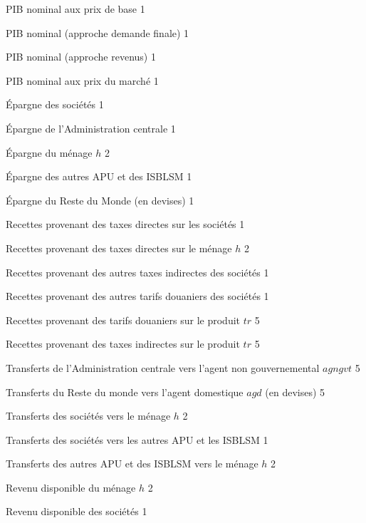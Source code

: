 \documentclass[11pt,a4paper]{article}
\newcommand{\agngvt}{\mathit{agngvt}}
\newcommand{\agd}{\mathit{agd}}
\newcommand{\gvt}{\mathsf{gvt}}
\newcommand{\firm}{\mathsf{firm}}
\newcommand{\ngo}{\mathsf{ngo}}
\newcommand{\row}{\mathsf{row}}
\newcommand{\YDF}{\mathit{YDF}}
\newcommand{\SNG}{\mathit{SNG}}
\newcommand{\SF}{\mathit{SF}}
\newcommand{\SG}{\mathit{SG}}
\newcommand{\SH}{\mathit{SH}}
\newcommand{\TI}{\mathit{TI}}
\newcommand{\TIF}{\mathit{TIF}}
\newcommand{\TIM}{\mathit{TIM}}
\newcommand{\TIMF}{\mathit{TIMF}}
\newcommand{\TRA}{\mathit{TRA}}
\newcommand{\tr}{\mathit{tr}}
\newcommand{\TDH}{\mathit{TDH}}
\newcommand{\TDF}{\mathit{TDF}}
\newcommand{\YDH}{\mathit{YDH}}
\newcommand{\SROW}{\mathit{SROW}}
\newcommand{\PIB}{\mathit{PIB}}
\begin{document}
\begin{description}[leftmargin=!,labelwidth=\widthof{\bfseries AAAAAAAA},parsep=10pt]
		\item[$\PIB^{\mathit{BP}}$]	PIB nominal aux prix de base			\hfill 1
		\item[$\PIB^{\mathit{FD}}$]	PIB nominal (approche demande finale)	\hfill 1
		\item[$\PIB^{\mathit{IB}}$]	PIB nominal (approche revenus)			\hfill 1
		\item[$\PIB^{\mathit{MP}}$]	PIB nominal aux prix du marché			\hfill 1%
		\item[$\SF$]	Épargne des sociétés 					\hfill 1
		\item[$\SG$]	Épargne de l'Administration centrale 	\hfill 1
		\item[$\SH_h$]	Épargne du ménage $h$ 					\hfill 2
		\item[$\SNG$]	Épargne des autres APU et des ISBLSM 	\hfill 1
		\item[$\SROW$]  Épargne du Reste du Monde (en devises) 				\hfill 1%
		\item[$\TDF$]	Recettes provenant des taxes directes sur les sociétés 				\hfill 1
		\item[$\TDH_h$]	Recettes provenant des taxes directes sur le ménage $h$ 			\hfill 2
		\item[$\TIF$]	Recettes provenant des autres taxes indirectes des sociétés 		\hfill 1
		\item[$\TIMF$]	Recettes provenant des autres tarifs douaniers des sociétés 		\hfill 1
		\item[$\TIM_{\tr}$]	Recettes provenant des tarifs douaniers sur le produit $\tr$ 	\hfill 5
		\item[$\TI_{\tr}$]	Recettes provenant des taxes indirectes sur le produit $\tr$ 	\hfill 5%
		\item[$\TRA_{\agngvt,\gvt}$]   Transferts de l'Administration centrale vers l'agent non gouvernemental  $\agngvt$			\hfill 5
		\item[$\TRA_{\agd,\row}$]   Transferts du Reste du monde vers l'agent domestique  $\agd$ (en devises) 			\hfill 5
		\item[$\TRA_{h,\firm}$]   Transferts des sociétés vers le ménage    $h$			\hfill 2
		\item[$\TRA_{\ngo,\firm}$]   Transferts des sociétés vers les autres APU et les ISBLSM   			\hfill 1
		\item[$\TRA_{h,\ngo}$]   Transferts des autres APU et des ISBLSM vers le ménage $h$ \hfill 2
		\item[$\YDH_h$]	Revenu disponible du ménage $h$ 	\hfill 2
		\item[$\YDF$]	Revenu disponible des sociétés	 	\hfill 1

\end{description}
\end{document}

